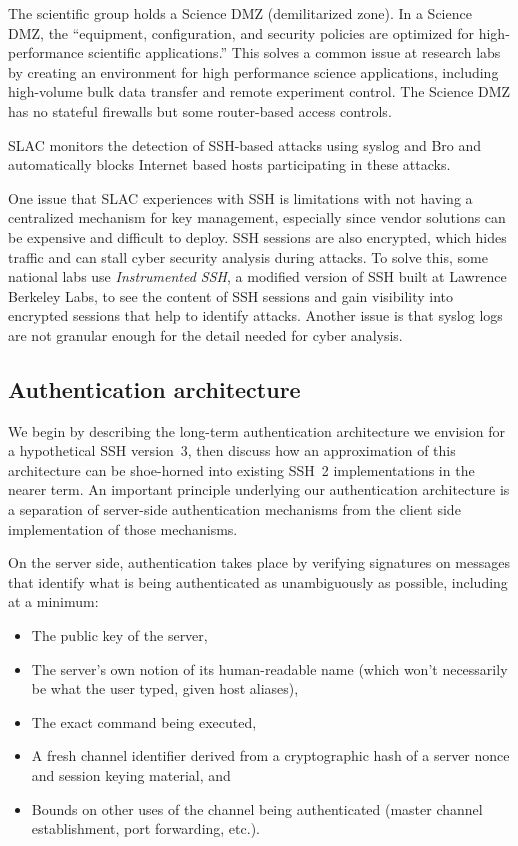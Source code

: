 \documentclass[11pt]{article}
\begin{document}
The scientific group holds a Science DMZ (demilitarized zone). In a
Science DMZ, the ``equipment, configuration, and security policies are
optimized for high-performance scientific applications.'' This solves
a common issue at research labs by creating an environment for high
performance science applications, including high-volume bulk data
transfer and remote experiment control. The Science DMZ has no
stateful firewalls but some router-based access controls.

SLAC monitors the detection of SSH-based attacks using syslog and Bro
and automatically blocks Internet based hosts participating in these
attacks.

One issue that SLAC experiences with SSH is limitations with not
having a centralized mechanism for key management, especially since
vendor solutions can be expensive and difficult to deploy. SSH
sessions are also encrypted, which hides traffic and can stall cyber
security analysis during attacks. To solve this, some national labs
use \emph{Instrumented SSH}, a modified version of SSH built at
Lawrence Berkeley Labs, to see the content of SSH sessions and gain
visibility into encrypted sessions that help to identify
attacks. Another issue is that syslog logs are not granular enough for
the detail needed for cyber analysis.

\subsection{Authentication architecture}

We begin by describing the long-term authentication architecture we
envision for a hypothetical SSH version~3, then discuss how an
approximation of this architecture can be shoe-horned into existing
SSH~2 implementations in the nearer term.  An important principle
underlying our authentication architecture is a separation of
server-side authentication mechanisms from the client side
implementation of those mechanisms.

On the server side, authentication takes place by verifying signatures
on messages that identify what is being authenticated as unambiguously
as possible, including at a minimum:
\begin{itemize}\itemsep=0pt
\item The public key of the server,
\item The server's own notion of its human-readable name (which won't
  necessarily be what the user typed, given host aliases),
\item The exact command being executed,
\item A fresh channel identifier derived from a cryptographic hash of
  a server nonce and session keying material, and
\item Bounds on other uses of the channel being authenticated (master
  channel establishment, port forwarding, etc.).
\end{itemize}
\end{document}
